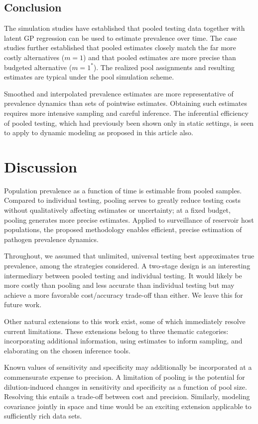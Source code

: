\documentclass{article}
\begin{document}
\subsection{Conclusion}

The simulation studies have established that pooled testing data together with latent GP regression can be used to estimate prevalence over time. The case studies further established that pooled estimates closely match the far more costly alternatives ($m=1$) and that pooled estimates are more precise than budgeted alternative ($m=1^*$). The realized pool assignments and resulting estimates are typical under the pool simulation scheme.

Smoothed and interpolated prevalence estimates are more representative of prevalence dynamics than sets of pointwise estimates. Obtaining such estimates requires more intensive sampling and careful inference. The inferential efficiency of pooled testing, which had previously been shown only in static settings, is seen to apply to dynamic modeling as proposed in this article also. 

\section{Discussion}

Population prevalence as a function of time is estimable from pooled samples. Compared to individual testing, pooling serves to greatly reduce testing costs without qualitatively affecting estimates or uncertainty; at a fixed budget, pooling generates more precise estimates. Applied to surveillance of reservoir host populations, the proposed methodology enables efficient, precise estimation of pathogen prevalence dynamics. 

Throughout, we assumed that unlimited, universal testing best approximates true prevalence, among the strategies considered. A two-stage design is an interesting intermediary between pooled testing and individual testing. It would likely be more costly than pooling and less accurate than individual testing but may achieve a more favorable cost/accuracy trade-off than either. We leave this for future work.

Other natural extensions to this work exist, some of which immediately resolve current limitations. These extensions belong to three thematic categories: incorporating additional information, using estimates to inform sampling, and elaborating on the chosen inference tools.

Known values of sensitivity and specificity may additionally be incorporated at a commensurate expense to precision. A limitation of pooling is the potential for dilution-induced changes in sensitivity and specificity as a function of pool size. Resolving this entails a trade-off between cost and precision. Similarly, modeling covariance jointly in space and time would be an exciting extension applicable to sufficiently rich data sets. 
\end{document}
